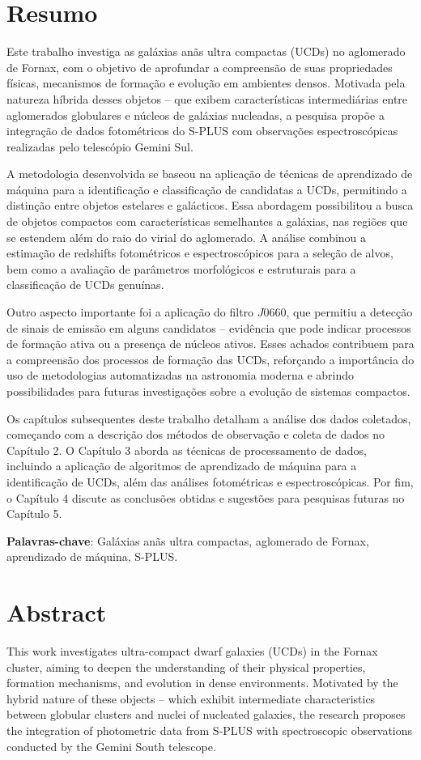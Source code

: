 \thispagestyle{empty}
\chapter*{Resumo}
Este trabalho investiga as galáxias anãs ultra compactas (UCDs) no aglomerado de Fornax, com o objetivo de aprofundar a compreensão de suas propriedades físicas, mecanismos de formação e evolução em ambientes densos. Motivada pela natureza híbrida desses objetos – que exibem características intermediárias entre aglomerados globulares e núcleos de galáxias nucleadas, a pesquisa propõe a integração de dados fotométricos do S-PLUS com observações espectroscópicas realizadas pelo telescópio Gemini Sul.

A metodologia desenvolvida se baseou na aplicação de técnicas de aprendizado de máquina para a identificação e classificação de candidatas a UCDs, permitindo a distinção entre objetos estelares e galácticos. Essa abordagem possibilitou a busca de objetos compactos com características semelhantes a galáxias, nas regiões que se estendem além do raio do virial do aglomerado. A análise combinou a estimação de redshifts fotométricos e espectroscópicos para a seleção de alvos, bem como a avaliação de parâmetros morfológicos e estruturais para a classificação de UCDs genuínas.

Outro aspecto importante foi a aplicação do filtro $J0660$, que permitiu a detecção de sinais de emissão em alguns candidatos – evidência que pode indicar processos de formação ativa ou a presença de núcleos ativos. Esses achados contribuem para a compreensão dos processos de formação das UCDs, reforçando a importância do uso de metodologias automatizadas na astronomia moderna e abrindo possibilidades para futuras investigações sobre a evolução de sistemas compactos.

Os capítulos subsequentes deste trabalho detalham a análise dos dados coletados, começando com a descrição dos métodos de observação e coleta de dados no Capítulo 2. O Capítulo 3 aborda as técnicas de processamento de dados, incluindo a aplicação de algoritmos de aprendizado de máquina para a identificação de UCDs, além das análises fotométricas e espectroscópicas. Por fim, o Capítulo 4 discute as conclusões obtidas e sugestões para pesquisas futuras no Capítulo 5.




\textbf{Palavras-chave}: Galáxias anãs ultra compactas, aglomerado de Fornax, aprendizado de máquina, S-PLUS.

\chapter*{Abstract}
This work investigates ultra-compact dwarf galaxies (UCDs) in the Fornax cluster, aiming to deepen the understanding of their physical properties, formation mechanisms, and evolution in dense environments. Motivated by the hybrid nature of these objects – which exhibit intermediate characteristics between globular clusters and nuclei of nucleated galaxies, the research proposes the integration of photometric data from S-PLUS with spectroscopic observations conducted by the Gemini South telescope.

